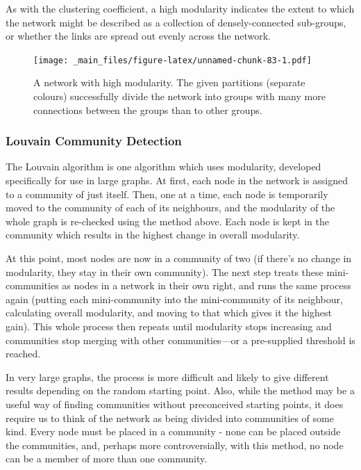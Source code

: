 \documentclass[
]{book}
\begin{document}
As with the clustering coefficient, a high modularity indicates the extent to which the network might be described as a collection of densely-connected sub-groups, or whether the links are spread out evenly across the network.

\begin{figure}
\centering
\texttt{[image: \_main\_files/figure-latex/unnamed-chunk-83-1.pdf]}
\caption{\label{fig:unnamed-chunk-83}A network with high modularity. The given partitions (separate colours) successfully divide the network into groups with many more connections between the groups than to other groups.}
\end{figure}

\hypertarget{louvain-community-detection}{%
\subsubsection{Louvain Community Detection}\label{louvain-community-detection}}

The Louvain algorithm is one algorithm which uses modularity, developed specifically for use in large graphs. At first, each node in the network is assigned to a community of just itself. Then, one at a time, each node is temporarily moved to the community of each of its neighbours, and the modularity of the whole graph is re-checked using the method above. Each node is kept in the community which results in the highest change in overall modularity.~

At this point, most nodes are now in a community of two (if there's no change in modularity, they stay in their own community). The next step treats these mini-communities as nodes in a network in their own right, and runs the same process again (putting each mini-community into the mini-community of its neighbour, calculating overall modularity, and moving to that which gives it the highest gain). This whole process then repeats until modularity stops increasing and communities stop merging with other communities---or a pre-supplied threshold is reached.

In very large graphs, the process is more difficult and likely to give different results depending on the random starting point. Also, while the method may be a useful way of finding communities without preconceived starting points, it does require us to think of the network as being divided into communities of some kind. Every node must be placed in a community - none can be placed outside the communities, and, perhaps more controversially, with this method, no node can be a member of more than one community.~
\end{document}
